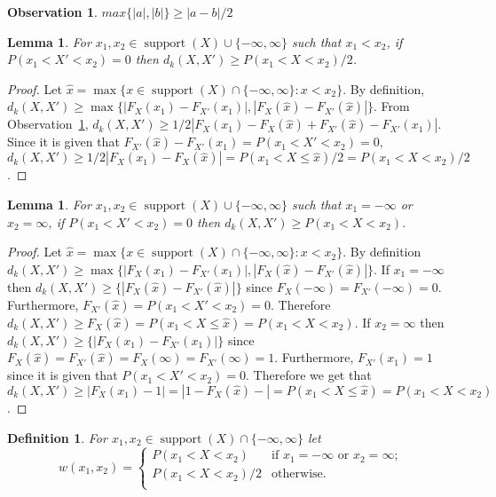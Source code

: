 \documentclass{article}
\newtheorem{lemma}[thm]{Lemma}
\newtheorem{definition}[thm]{Definition}
\newtheorem{observation}[thm]{Observation}
\DeclareMathOperator{\support}{support}
\begin{document}
\begin{observation}\label{obs:ab}
	$max\{|a|,|b|\} \geq |a-b|/2$
\end{observation}

\begin{lemma}\label{lem:geq}
	For $x_1, x_2 \in \support(X) \cup \{-\infty,\infty\}$ such that $x_1 < x_2$, if $P(x_1 < X' < x_2)=0$  then 
	$d_k(X,X') \geq P(x_1 < X < x_2)/2$.
\end{lemma}
\begin{proof}
	Let $\hat x=\max \{x \in \support(X) \cap\{ -\infty, \infty\}  \colon x < x_2 \}$. By definition, $d_k(X,X') \geq \max \{|F_X(x_1) - F_{X'}(x_1)|, |F_X(\hat x) - F_{X'}(\hat x)| \}$. From Observation~\ref{obs:ab}, $d_k(X,X') \geq 1/2|F_X(x_1) - F_X(\hat x) + F_{X'}(\hat x) - F_{X'}(x_1)|$. Since it is given that $F_{X'}(\hat x) - F_{X'}(x_1) = P(x_1 < X' < x_2)=0$, $d_k(X,X') \geq 1/2|F_X(x_1) - F_X(\hat x) | =  P(x_1 < X \leq \hat x)/2 = P(x_1 < X < x_2)/2$.
\end{proof}


\begin{lemma}\label{lem:geq2}
	For $x_1, x_2 \in \support(X) \cup \{-\infty,\infty\}$ such that $x_1=-\infty$ or  $x_2=\infty$, if $P(x_1 < X' < x_2)=0$  then 
	$d_k(X,X') \geq P(x_1 < X < x_2)$.
\end{lemma}
\begin{proof}
	Let $\hat x=\max \{x \in \support(X) \cap\{ -\infty, \infty\}  \colon x < x_2 \}$. By definition $d_k(X,X') \geq \max \{|F_X(x_1) - F_{X'}(x_1)|, |F_X(\hat x) - F_{X'}(\hat x)| \}$. If $x_1=-\infty$ then $d_k(X,X') \geq \{|F_X(\hat x) - F_{X'}(\hat x)| \}$ since $F_X(-\infty) = F_{X'}(-\infty) = 0$. Furthermore, $F_{X'}(\hat x) = P(x_1 < X' < x_2)=0$. Therefore $d_k(X,X') \geq F_X(\hat x) = P(x_1 < X \leq \hat x) = P(x_1 < X < x_2)$. 
	If $x_2=\infty$ then $d_k(X,X') \geq \{|F_X(x_1) - F_{X'}(x_1)| \}$ since $F_X(\hat{x}) = F_{X'}(\hat{x}) = F_X(\infty) = F_{X'}(\infty) = 1$. Furthermore, $F_{X'}(x_1) = 1$ since it is given that $P(x_1 < X' < x_2)=0$. Therefore we get that $d_k(X,X') \geq |F_X(x_1)-1| = |1-F_X(\hat x)-| = P(x_1 < X \leq \hat x) = P(x_1 < X < x_2)$.
\end{proof}


\begin{definition} For $x_1,x_2 \in \support(X) \cap \{-\infty,\infty\}$ let
	\[
	w(x_1,x_2)=
	\begin{cases}
		P(x_1 < X < x_2) & \text{if $x_1=-\infty$ or $x_2 = \infty$;} \\
		P(x_1 < X < x_2)/2 & \text{otherwise.} \\	
	\end{cases}
	\]
\end{definition} 
\end{document}
